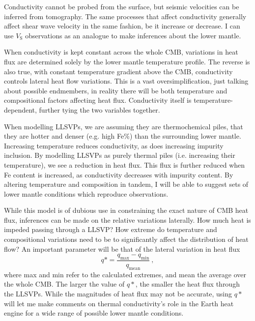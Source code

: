 Conductivity cannot be probed from the surface, but seismic velocities can be inferred from tomography. The same processes that affect conductivity generally affect shear wave velocity in the same fashion, be it increase or decrease. I can use $V_{\mathrm{S}}$ observations as an analogue to make inferences about the lower mantle.

When conductivity is kept constant across the whole CMB, variations in heat flux are determined solely by the lower mantle temperature profile. The reverse is also true, with constant temperature gradient above the CMB, conductivity controls lateral heat flow variations. This is a vast oversimplification, just talking about possible endmembers, in reality there will be both temperature and compositional factors affecting heat flux. Conductivity itself is temperature-dependent, further tying the two variables together.

When modelling LLSVPs, we are assuming they are thermochemical piles, that they are hotter and denser (e.g. high Fe\%) than the surrounding lower mantle. Increasing temperature reduces conductivity, as does increasing impurity inclusion. By modelling LLSVPs as purely thermal piles (i.e. increasing their temperature), we see a reduction in heat flux. This flux is further reduced when Fe content is increased, as conductivity decreases with impurity content. By altering temperature and composition in tandem, I will be able to suggest sets of lower mantle conditions which reproduce observations.

While this model is of dubious use in constraining the exact nature of CMB heat flux, inferences can be made on the relative variations laterally. How much heat is impeded passing through a LLSVP? How extreme do temperature and compositional variations need to be to significantly affect the distribution of heat flow? An important parameter will be that of the lateral variation in heat flux
%
\begin{equation}
\label{eq.q_star}
q* = \frac{q_{\mathrm{max}}-q_{\mathrm{min}}}{q_{\mathrm{mean}}}\ ,
\end{equation}
%
where max and min refer to the calculated extremes, and mean the average over the whole CMB. The larger the value of $q*$, the smaller the heat flux through the LLSVPs. While the magnitudes of heat flux may not be accurate, using $q*$ will let me make comments on thermal conductivity's role in the Earth heat engine for a wide range of possible lower mantle conditions.







